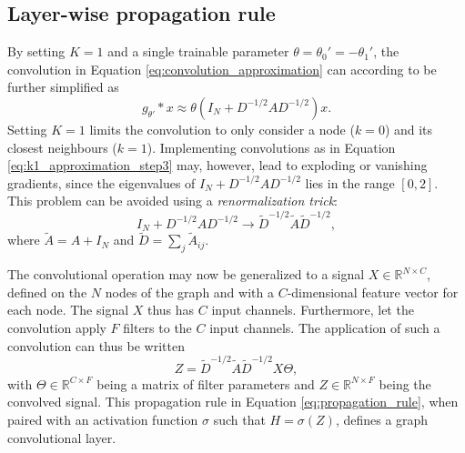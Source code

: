 \subsection{Layer-wise propagation rule}
By setting $K = 1$ and a single trainable parameter $\theta = \theta_0' = -\theta_1'$, the convolution in Equation \eqref{eq:convolution_approximation} can according to \cite{kipf_semi_supervised} be further simplified as 
\begin{equation}
    g_{\theta'} * x \approx \theta \left(I_N + D^{-1/2}AD^{-1/2} \right)x. 
    \label{eq:k1_approximation_step3}
\end{equation}
Setting $K=1$ limits the convolution to only consider a node ($k=0$) and its closest neighbours ($k=1$). Implementing convolutions as in Equation \eqref{eq:k1_approximation_step3} may, however, lead to exploding or vanishing gradients, since the eigenvalues of $I_N + D^{-1/2}AD^{-1/2}$ lies in the range $[0, 2]$. This problem can be avoided using a \textit{renormalization trick}:
\begin{equation}
    I_N + D^{-1/2}AD^{-1/2} \rightarrow \tilde{D}^{-1/2} \tilde{A} \tilde{D}^{-1/2},
    \label{eq:renormalization_trick}
\end{equation}
where $\tilde{A} = A + I_N$ and $\tilde{D} = \sum_j \tilde{A}_{ij}$.

The convolutional operation may now be generalized to a signal $X \in \mathbb{R}^{N \times C}$, defined on the $N$ nodes of the graph and with a $C$-dimensional feature vector for each node. The signal $X$ thus has $C$ input channels. Furthermore, let the convolution apply $F$ filters to the $C$ input channels. The application of such a convolution can thus be written
\begin{equation}
    Z = \tilde{D}^{-1/2} \tilde{A} \tilde{D}^{-1/2} X \Theta,
    \label{eq:propagation_rule}
\end{equation}
with $\Theta \in \mathbb{R}^{C\times F}$ being a matrix of filter parameters and $Z \in \mathbb{R}^{N\times F}$ being the convolved signal. This propagation rule in Equation \eqref{eq:propagation_rule}, when paired with an activation function $\sigma$ such that $H = \sigma\left(Z \right)$, defines a graph convolutional layer. 

